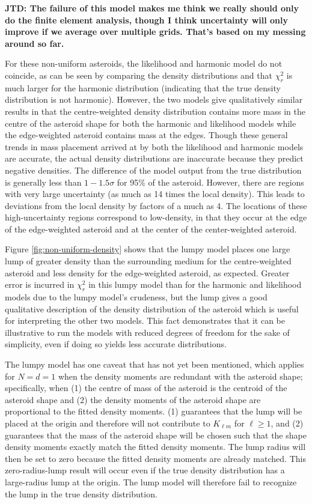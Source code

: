 \documentclass[fleqn,usenatbib]{mnras}
\newcommand{\jtd}[1]{ {\bf{\color{red} JTD: #1}} }
\begin{document}
\jtd{The failure of this model makes me think we really should only do the finite element analysis, though I think uncertainty will only improve if we average over multiple grids. That's based on my messing around so far.}

For these non-uniform asteroids, the likelihood and harmonic model do not coincide, as can be seen by comparing the density distributions and that $\chi_r^2$ is much larger for the harmonic distribution (indicating that the true density distribution is not harmonic). However, the two models give qualitatively similar results in that the centre-weighted density distribution contains more mass in the centre of the asteroid shape for both the harmonic and likelihood models while the edge-weighted asteroid contains mass at the edges. Though these general trends in mass placement arrived at by both the likelihood and harmonic models are accurate, the actual density distributions are inaccurate because they predict negative densities. The difference of the model output from the true distribution is generally less than $1-1.5\sigma$ for 95\% of the asteroid. However, there are regions with very large uncertainty (as much as 14 times the local density). This leads to deviations from the local density by factors of a much as 4. The locations of these high-uncertainty regions correspond to low-density, in that they occur at the edge of the edge-weighted asteroid and at the center of the center-weighted asteroid.

Figure \ref{fig:non-uniform-density} shows that the lumpy model places one large lump of greater density than the surrounding medium for the centre-weighted asteroid and less density for the edge-weighted asteroid, as expected. Greater error is incurred in $\chi^2_r$ in this lumpy model than for the harmonic and likelihood models due to the lumpy model's crudeness, but the lump gives a good qualitative description of the density distribution of the asteroid which is useful for interpreting the other two models. This fact demonstrates that it can be illustrative to run the models with reduced degrees of freedom for the sake of simplicity, even if doing so yields less accurate distributions.



The lumpy model has one caveat that has not yet been mentioned, which applies for $N=d=1$ when the density moments are redundant with the asteroid shape; specifically, when (1) the centre of mass of the asteroid is the centroid of the asteroid shape and (2) the density moments of the asteroid shape are proportional to the fitted density moments. (1) guarantees that the lump will be placed at the origin and therefore will not contribute to $K_{\ell m}$ for $\ell \geq 1$, and (2) guarantees that the mass of the asteroid shape will be chosen such that the shape density moments exactly match the fitted density moments. The lump radius will then be set to zero because the fitted density moments are already matched. This zero-radius-lump result will occur even if the true density distribution has a large-radius lump at the origin. The lump model will therefore fail to recognize the lump in the true density distribution.
\end{document}
